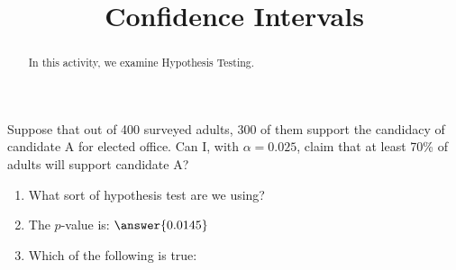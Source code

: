 \documentclass{ximera}
\title{Confidence Intervals}
\begin{document}
      
\begin{abstract}
      
In this activity, we examine Hypothesis Testing.

      
\end{abstract}
      
\maketitle
 

\begin{problem}
Suppose that out of 400 surveyed adults, 300 of them support the candidacy of candidate A for elected office.  Can I, with $\alpha=0.025$, claim that at least 70\% of adults will support candidate A?

\begin{enumerate}
\item What sort of hypothesis test are we using?

\begin{multipleChoice}
\end{multipleChoice}

\item The $p$-value is: $\answer{0.0145}$

\item Which of the following is true:

\begin{multipleChoice}
\end{multipleChoice}


\end{enumerate}



\end{problem}
\end{document}
